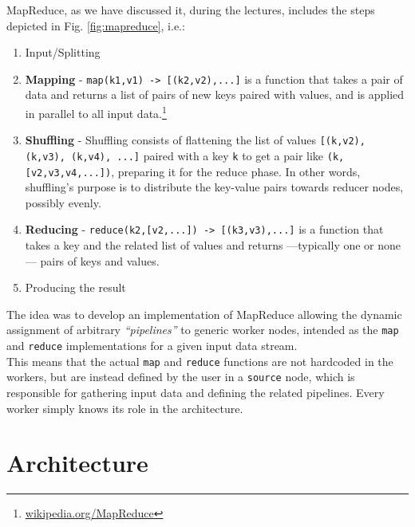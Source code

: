 {MapReduce, as we have discussed it, during the lectures, includes the steps depicted in Fig. \ref{fig:mapreduce}, i.e.:\ns
\begin{enumerate}
   \item Input/Splitting
   \item \textbf{Mapping} - \lstinline{map(k1,v1) -> [(k2,v2),...]} is a function that takes a pair of data and returns a list of pairs of new keys paired with values, and is applied in parallel to all input data.\footnote{\href{https://en.wikipedia.org/wiki/MapReduce}{wikipedia.org/MapReduce}}
   \item \textbf{Shuffling} - Shuffling consists of flattening the list of values \lstinline{[(k,v2), (k,v3), (k,v4), ...]} paired with a key \texttt{k} to get a pair like \lstinline|(k,[v2,v3,v4,...])|, preparing it for the reduce phase. In other words, shuffling's purpose is to distribute the key-value pairs towards reducer nodes, possibly evenly. 
   \item \textbf{Reducing} - \lstinline|reduce(k2,[v2,...]) -> [(k3,v3),...]| is a function that takes a key and the related list of values and returns ---typically one or none--- pairs of keys and values. 
   \item Producing the result
\end{enumerate}}

The idea was to develop an implementation of MapReduce allowing the dynamic assignment of arbitrary \textit{``pipelines''} to generic worker nodes, intended as the \lstinline|map| and \lstinline|reduce| implementations for a given input data stream.\\
This means that the actual \lstinline|map| and \lstinline|reduce| functions are not hardcoded in the workers, but are instead defined by the user in a \texttt{source} node, which is responsible for gathering input data and defining the related pipelines.
Every worker simply knows its role in the architecture.

\section{Architecture}

